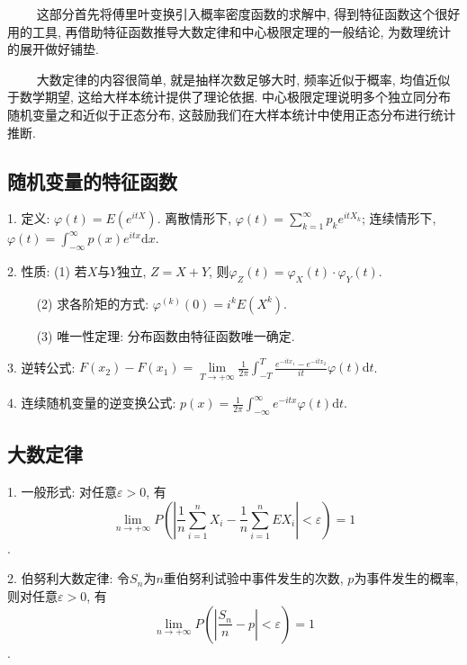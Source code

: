 \begin{tcolorbox}[colback=red!5,colframe=red!75!black]
    ~~~~ 这部分首先将傅里叶变换引入概率密度函数的求解中, 得到特征函数这个很好用的工具, 再借助特征函数推导大数定律和中心极限定理的一般结论, 为数理统计的展开做好铺垫.
    
    ~~~~ 大数定律的内容很简单, 就是抽样次数足够大时, 频率近似于概率, 均值近似于数学期望, 这给大样本统计提供了理论依据. 中心极限定理说明多个独立同分布随机变量之和近似于正态分布, 这鼓励我们在大样本统计中使用正态分布进行统计推断.
\end{tcolorbox}

\subsection{随机变量的特征函数}

1. 定义: $\varphi(t)=E(e^{itX})$. 离散情形下, $\varphi(t)=\sum\limits_{k=1}^\infty p_ke^{itX_k}$; 连续情形下, $\varphi(t)=\int_{-\infty}^\infty p(x)e^{itx}\mathrm{d}x$.

2. 性质: (1) 若$X$与$Y$独立, $Z=X+Y$, 则$\varphi_Z(t)=\varphi_X(t)\cdot \varphi_Y(t)$.

~~~~ (2) 求各阶矩的方式: $\varphi^{(k)}(0)=i^kE(X^k)$.

~~~~ (3) 唯一性定理: 分布函数由特征函数唯一确定.

3. 逆转公式: $F(x_2)-F(x_1)=\lim\limits_{T\rightarrow +\infty}\frac{1}{2\pi}\int_{-T}^T \frac{e^{-itx_1}-e^{-itx_2}}{it}\varphi(t)\mathrm{d}t$.

4. 连续随机变量的逆变换公式: $p(x)=\frac{1}{2\pi} \int_{-\infty}^\infty e^{-itx}\varphi(t)\mathrm{d}t$.

\subsection{大数定律}

1. 一般形式: 对任意$\varepsilon>0$, 有
\begin{equation*}
    \lim\limits_{n\rightarrow +\infty} P\left(\left| \frac{1}{n}\sum\limits_{i=1}^n X_i-\frac{1}{n}\sum\limits_{i=1}^n EX_i \right|<\varepsilon\right)=1
\end{equation*}.

2. 伯努利大数定律: 令$S_n$为$n$重伯努利试验中事件发生的次数, $p$为事件发生的概率, 则对任意$\varepsilon>0$, 有
\begin{equation*}
    \lim\limits_{n\rightarrow +\infty} P\left(\left| \frac{S_n}{n}-p \right|<\varepsilon\right)=1
\end{equation*}.

